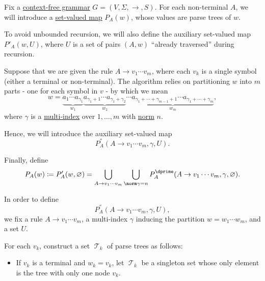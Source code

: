 \begin{algorithm}\label{alg:brute_force_parsing}
  Fix a \hyperref[def:chomsky_hierarchy/context_free]{context-free grammar} \( G = (V, \Sigma, \to, S) \). For each non-terminal \( A \), we will introduce a \hyperref[def:function]{set-valued map} \( P_A(w) \), whose values are parse trees of \( w \).

  To avoid unbounded recursion, we will also define the auxiliary set-valued map \( P'_A(w, U) \), where \( U \) is a set of pairs \( (A, w) \) \enquote{already traversed} during recursion.

  Suppose that we are given the rule \( A \to v_1 \cdots v_m \), where each \( v_k \) is a single symbol (either a terminal or non-terminal). The algorithm relies on partitioning \( w \) into \( m \) parts - one for each symbol in \( v \) - by which we mean
  \begin{equation*}
    w = \underbrace{ a_1 \cdots a_{\gamma_1} }_{w_1} \underbrace{ a_{\gamma_1 + 1} \cdots a_{\gamma_1 + \gamma_2} }_{w_2} \cdots \underbrace{ a_{\gamma_1 + \cdots + \gamma_{m-1} + 1} \cdots a_{\gamma_1 + \cdots + \gamma_m} }_{w_m},
  \end{equation*}
  where \( \gamma \) is a \hyperref[def:multi_index]{multi-index} over \( 1, \ldots, m \) with \hyperref[def:multi_index]{norm} \( n \).

  Hence, we will introduce the auxiliary set-valued map
  \begin{equation*}
    P^\dprime_A(A \to v_1 \cdots v_m, \gamma, U).
  \end{equation*}

  Finally, define
  \begin{equation*}
    P_A(w)
    \coloneqq
    P'_A(w, \varnothing)
    =
    \bigcup_{A \to v_1 \cdots v_m} \bigcup_{\norm \gamma = n} P^\dprime_A(A \to v_1 \cdots v_m, \gamma, \varnothing).
  \end{equation*}

  \begin{thmenum}
     In order to define
    \begin{equation*}
      P^\dprime_A(A \to v_1 \cdots v_m, \gamma, U),
    \end{equation*}
    we fix a rule \( A \to v_1 \cdots v_m \), a multi-index \( \gamma \) inducing the partition \( w = w_1 \cdots w_m \), and a set \( U \).

     For each \( v_k \), construct a set \( \mscrT_k \) of parse trees as follows:
    \begin{itemize}
      \item If \( v_k \) is a terminal and \( w_k = v_k \), let \( \mscrT_k \) be a singleton set whose only element is the tree with only one node \( v_k \).


\end{itemize}
\end{thmenum}
\end{algorithm}
